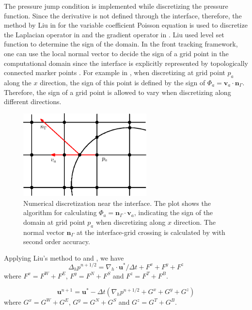 The pressure jump condition is implemented while discretizing the pressure
function. Since the derivative is not defined through the interface, therefore,
the method by Liu in \cite{liu2000boundary} for the variable coefficient
Poisson equation is used to discretize the Laplacian operator in  and
the gradient operator in .  Liu used level set function
\cite{osher1988fronts} to determine the sign of the domain. In the front
tracking framework, one can use the local normal vector to decide the sign of a
grid point in the computational domain since the interface is explicitly
represented by topologically connected marker points \cite{GliGroLi98}.  For
example in , when discretizing at grid point $p_a$ along the $x$
direction, the sign of this point is defined by the sign of $\Phi_a =
\mathbf{v}_a\cdot \mathbf{n}_{\Gamma}$.  Therefore, the sign of a grid point is
allowed to vary when discretizing along different directions.

\begin{figure}[!htbp] \centering
\includegraphics[width=0.6\textwidth]{Figures/grid.eps}
\caption{Numerical discretization near the interface. The plot
shows the algorithm for calculating
$\Phi_a = \mathbf{n}_\Gamma\cdot \mathbf{v}_a$, indicating the sign of the
domain at grid point $p_a$ when discretizing along $x$ direction. The normal
vector $\mathbf{n}_\Gamma$ at the interface-grid crossing is calculated by
\FronTierp with second order accuracy.}
\label{grid}
\end{figure}

Applying Liu's method to  and , we have
\begin{equation} \Delta_h p^{n+1/2}
= \nabla_h\cdot \mathbf{u}^*/\Delta t + F^x + F^y + F^z \label{newLap}
\end{equation} where $F^x = F^W + F^E$, $F^y = F^N + F^S$ and $F^z = F^T + F^B$.

\begin{equation} \label{newGrad} \mathbf{u}^{n+1} = \mathbf{u}^* - \Delta
t(\nabla_h p^{n+1/2} + G^x + G^y + G^z) \end{equation} where $G^x = G^W + G^E$,
$G^y = G^N + G^S$ and $G^z = G^T + G^B$.

